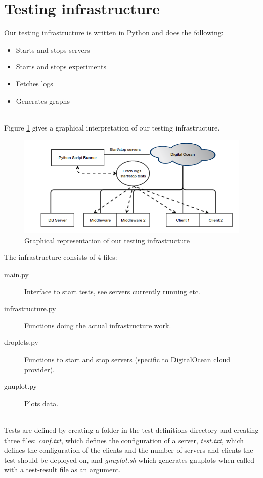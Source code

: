 \documentclass{article}
\begin{document}
    \section{Testing infrastructure}
        Our testing infrastructure is written in Python and does the following:
        \begin{itemize}
            \item Starts and stops servers
            \item Starts and stops experiments
            \item Fetches logs
            \item Generates graphs
        \end{itemize}
        ~\\
        Figure \ref{fig:testing_infrastructure} gives a graphical interpretation of our testing infrastructure.\\
         \begin{figure}[H]
             \centering
             \centerline{\includegraphics[scale=0.50]{testing_infrastructure}}
             \caption{Graphical representation of our testing infrastructure}
             \label{fig:testing_infrastructure}
         \end{figure}
        The infrastructure consists of 4 files:
        \begin{description}
            \item[main.py] Interface to start tests, see servers currently running etc.
            \item[infrastructure.py] Functions doing the actual infrastructure work.
            \item[droplets.py] Functions to start and stop servers (specific to DigitalOcean cloud provider).
            \item[gnuplot.py] Plots data.
        \end{description}
        ~\\
        Tests are defined by creating a folder in the test-definitions directory and creating three files: \textit{conf.txt}, which defines the configuration of a server, \textit{test.txt}, which defines the configuration of the clients and the number of servers and clients the test should be deployed on, and \textit{gnuplot.sh} which generates gnuplots when called with a test-result file as an argument.\\
\end{document}
